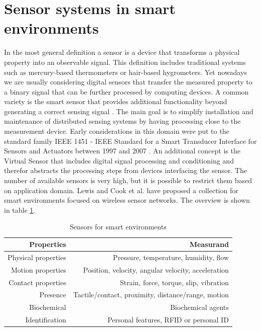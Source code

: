 \section{Sensor systems in smart environments}
In the most general definition a sensor is a device that transforms a physical property into an observable signal. This definition includes traditional systems such as mercury-based thermometers or hair-based hygrometers. Yet nowadays we are usually considering digital sensors that transfer the measured property to a binary signal that can be further processed by computing devices. 
A common variety is the smart sensor that provides additional functionality beyond generating a correct sensing signal \cite{frank2013understanding}. The main goal is to simplify installation and maintenance of distributed sensing systems by having processing close to the measurement device. Early considerations in this domain were put to the standard family IEEE 1451 - IEEE Standard for a Smart Transducer Interface for Sensors and Actuators between 1997 and 2007 \cite{ieee1451}. An additional concept is the Virtual Sensor that includes digital signal processing and conditioning and therefor abstracts the processing steps from devices interfacing the sensor. 
The number of available sensors is very high, but it is possible to restrict them based on application domain. Lewis and Cook et al. \cite{lewis2004wireless,cook2007smart} have proposed a collection for smart environments focused on wireless sensor networks. The overview is shown in table \ref{tab:sen_smart_env}.
\begin{table}[htbp]
  \centering
  \caption{Sensors for smart environments \cite{cook2007smart}}
    \begin{tabular}{rr}
    \toprule
    \textbf{Properties } & \textbf{Measurand} \\
    \midrule
    Physical properties  & Pressure, temperature, humidity, flow \\ \addlinespace
    Motion properties  & Position, velocity, angular velocity, acceleration \\ \addlinespace
    Contact properties  & Strain, force, torque, slip, vibration \\ \addlinespace
    Presence  & Tactile/contact, proximity, distance/range, motion \\ \addlinespace
    Biochemical  & Biochemical agents \\ \addlinespace
    Identification  & Personal features, RFID or personal ID \\
    \bottomrule
    \end{tabular}%

  \label{tab:sen_smart_env}%
\end{table}%
